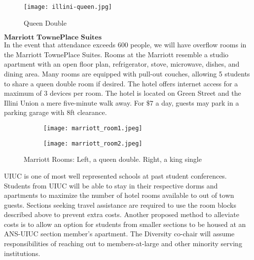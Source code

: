 \begin{figure}[H]
	\centering
	\texttt{[image: illini-queen.jpg]}
	\caption{Queen Double}		
\end{figure} 

$\textbf{Marriott TownePlace Suites}$\\
In the event that attendance exceeds 600 people, we will have overflow rooms in the Marriott TownePlace Suites. Rooms at the Marriott resemble a studio apartment with an open floor plan, refrigerator, stove, microwave, dishes, and dining area. Many rooms are equipped with pull-out couches, allowing 5 students to share a queen double room if desired. The hotel offers internet access for a maximum of 3 devices per room. The hotel is located on Green Street and the Illini Union a mere five-minute walk away. For $\$7$ a day, guests may park in a parking garage with 8ft clearance.\\
\begin{figure}[H]
	\centering
	\begin{subfigure}{0.5\textwidth}
		\centering
		\texttt{[image: marriott\_room1.jpeg]}
	\end{subfigure}%
	\begin{subfigure}{0.5\textwidth}
		\centering
		\texttt{[image: marriott\_room2.jpeg]}
	\end{subfigure}
	\caption{Marriott Rooms: Left, a queen double. Right, a king single}		
\end{figure} 

UIUC is one of most well represented schools at past student conferences. Students from UIUC will be able to stay in their respective dorms and apartments to maximize the number of hotel rooms available to out of town guests. Sections seeking travel assistance are required to use the room blocks described above to prevent extra costs. Another proposed method to alleviate costs is to allow an option for students from smaller sections to be housed at an ANS-UIUC section member's apartment. The Diversity co-chair will assume responsibilities of reaching out to members-at-large and other minority serving institutions. 


\begin{table}
\caption{Cost of Hotels}
\label{table:hotels}
	\centering
\end{table}

